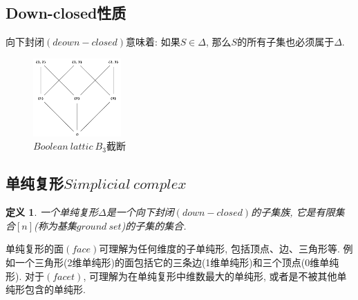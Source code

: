 \documentclass[12pt,a4paper]{ctexbook} %
\newcounter{theorem}[section]
\newtheorem{definition}[theorem]{定义}
\numberwithin{figure}{section}
\theoremstyle{problemstyle}
\numberwithin{equation}{section} %
\begin{document}
	\subsection{Down-closed性质}
	向下封闭$(deown-closed)$意味着: 如果$S\in \Delta$, 那么$S$的所有子集也必须属于$\Delta$. 
		\vspace{-0.4cm} %
	
\begin{figure}[H]
	\centering
	\includegraphics[width=0.3\textwidth]{Boolean lattic B_3截断}
	\caption{$Boolean\ lattic\ B_3$截断}%
\end{figure}

\subsection{单纯复形$Simplicial\ complex$}
	\begin{definition}
		一个单纯复形$\Delta$是一个向下封闭$(down-closed)$的子集族, 它是有限集合$[n]$(称为基集$ground\ set$)的子集的集合. 
	\end{definition}

		单纯复形的面$(face)$可理解为任何维度的子单纯形, 包括顶点、边、三角形等. 例如一个三角形(2维单纯形)的面包括它的三条边(1维单纯形)和三个顶点(0维单纯形). 对于$(facet)$, 可理解为在单纯复形中维数最大的单纯形, 或者是不被其他单纯形包含的单纯形. 
\end{document}
